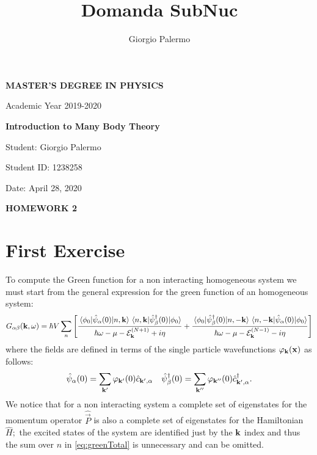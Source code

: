 \documentclass[a4paper]{article}
\title{Domanda SubNuc}
\author{Giorgio Palermo}
\begin{document}
\hypersetup{linkcolor = black}
\hypersetup{linkcolor = blue}

\begin{center}
    \textbf{MASTER'S DEGREE IN PHYSICS}
    
    Academic Year 2019-2020
    
    \medskip
    \textbf{Introduction to Many Body Theory}
\end{center}

\vspace{0.8cm}
Student: Giorgio Palermo

Student ID: 1238258

Date: April 28, 2020

\bigskip

\begin{center}
\textbf{HOMEWORK 2}
\end{center}

\section*{First Exercise}
\noindent To compute the Green function for a non interacting homogeneous system we must start from the general expression for the green function of an homogeneous system:
\begin{align}
G_{\alpha\beta}(\vb{k},\omega) = \hbar V \sum_n\bqty{\frac{\mel{\phi_0}{\hat{\psi}_\alpha(0)}{n,\vb{k}}\mel{n,\vb{k}}{\hat{\psi}^\dag_\beta(0)}{\phi_0}}{\hbar \omega -\mu -\mathcal{E}_{\vb{k}}^{(N+1)}+i\eta} + 
\frac{\mel{\phi_0}{\hat{\psi}^\dag_\beta(0)}{n,-\vb{k}}\mel{n,-\vb{k}}{\hat{\psi}_\alpha(0)}{\phi_0}}{\hbar \omega -\mu - \mathcal{E}_{\vb{k}}^{(N-1)} -i\eta}}
\label{eq:greenTotal}
\end{align}
where the fields are defined in terms of the single particle wavefunctions $\varphi_{\vb{k}}(\vb{x})$ as follows:
\begin{align}
&\hat{\psi}_\alpha(0) = \sum_{\vb{k}'} \varphi_{\vb{k}'}(0)\hat{c}_{\vb{k}',\alpha} 
&\hat{\psi}^\dag_\beta(0)= \sum_{\vb{k}''} \varphi_{\vb{k}''}(0)\hat{c}^\dag_{\vb{k}',\alpha}.
\end{align}
We notice that for a non interacting system a complete set of eigenstates for the momentum operator $\hat{\vec{P}}$ is also a complete set of eigenstates for the Hamiltonian $\hat{H};$ the excited states of the system are identified just by the $\vb{k}$ index and thus the sum over $n$ in \eqref{eq:greenTotal} is unnecessary and can be omitted.
\end{document}

